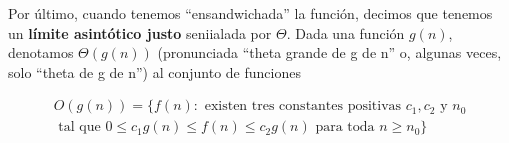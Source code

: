 \begin{definition}

Por \'ultimo, cuando tenemos ``ensandwichada'' la funci\'on, decimos que tenemos un \textbf{l\'imite asint\'otico justo} seniialada por $\Theta$. Dada una funci\'on $g(n)$, denotamos $\Theta(g(n))$ (pronunciada ``theta grande de g de n'' o, algunas veces, solo ``theta de g de n'') al conjunto de funciones

\begin{equation*}
\begin{split}
O(g(n)) = \{f(n): \text{ existen tres constantes positivas } c_1, c_2 \text{ y } n_0 \\
\text{ tal que } 0 \leq c_1g(n) \leq f(n) \leq c_2g(n) \text{ para toda } n \geq n_0\}
\end{split}
\end{equation*}
\end{definition}

